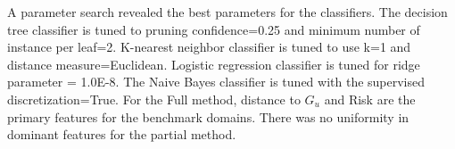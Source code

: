 \documentclass[letterpaper]{article}
\theoremstyle{plain}
\begin{document}
A parameter search revealed the best parameters for the classifiers. The decision tree classifier is tuned to pruning confidence=0.25 and minimum number of instance per leaf=2. K-nearest neighbor classifier is tuned to use k=1 and distance measure=Euclidean. Logistic regression classifier is tuned for ridge parameter = 1.0E-8. The Naive Bayes classifier is tuned with the supervised discretization=True. For the Full method, distance to $G_u$ and Risk are the primary features for the benchmark domains. There was no uniformity in dominant features for the partial method.

% 
 
\end{document}
